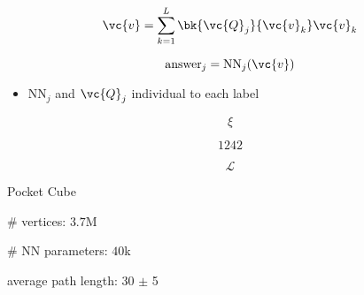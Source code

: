 \begin{equation*}
	\vc{v} = \sum_{k=1}^L \bk{\vc{Q}_j}{\vc{v}_k} \vc{v}_k
\end{equation*}

\begin{equation*}
	\text{answer}_j = \text{NN}_j(\vc{v})
\end{equation*}

\begin{itemize}
	\item NN${}_j$ and $\vc{Q}_j$ individual to each label
\end{itemize}

\begin{equation*}
	\xi
\end{equation*}

\begin{equation*}
	1242
\end{equation*}

\begin{equation*}
	\mathcal{L}
\end{equation*}


Pocket Cube

\# vertices:  $3.7$M


\phantom{42}

\# NN parameters: $40$k

average path length: 30 $\pm$ 5
